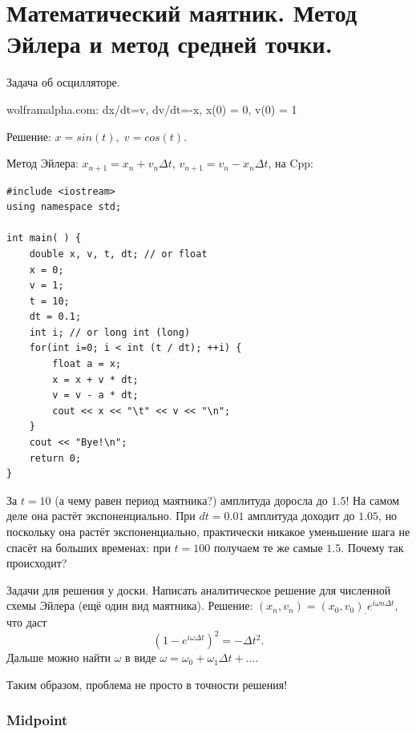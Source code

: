 \documentclass{book}
\begin{document}
\section{Математический маятник. Метод Эйлера и метод средней точки.}

Задача об осцилляторе.

wolframalpha.com: dx/dt=v, dv/dt=-x, x(0) = 0, v(0) = 1

Решение: $x = sin(t), \; v = cos(t)$.

Метод Эйлера: $x_{n+1} = x_n + v_n \Delta t$, $v_{n+1} = v_n - x_n \Delta t$, на Cpp:

\begin{verbatim}
#include <iostream> 
using namespace std;

int main( ) { 
    double x, v, t, dt; // or float
    x = 0; 
    v = 1; 
    t = 10; 
    dt = 0.1; 
    int i; // or long int (long)
    for(int i=0; i < int (t / dt); ++i) { 
        float a = x; 
        x = x + v * dt; 
        v = v - a * dt; 
        cout << x << "\t" << v << "\n";
    } 
    cout << "Bye!\n";
    return 0; 
}
\end{verbatim}
За $t = 10$ (а чему равен период маятника?) амплитуда доросла до $1.5$! На самом деле она растёт
экспоненциально. При $dt = 0.01$ амплитуда доходит до $1.05$, но поскольку она растёт
экспоненциально, практически никакое уменьшение шага не спасёт на больших временах: при $t = 100$
получаем те же самые $1.5$. Почему так происходит?

Задачи для решения у доски. Написать аналитическое решение для численной схемы Эйлера (ещё один вид
маятника). Решение: $(x_n, v_n) = (x_0, v_0)_\cdot e^{i \omega n \Delta t}$, что даст
\begin{equation}
    (1 - e^{i \omega \Delta t})^2 = -\Delta t^2.
\end{equation}
Дальше можно найти $\omega$ в виде $\omega = \omega_0 + \omega_1 \Delta t + ...$.

Таким образом, проблема не просто в точности решения!

\subsubsection{Midpoint}
\end{document}
